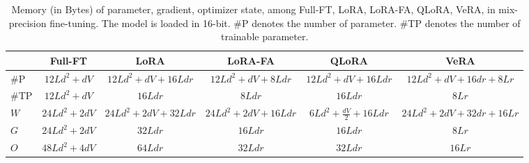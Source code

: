 \begin{table}[htbp]
\centering
\scriptsize
\caption{Memory (in Bytes) of parameter, gradient, optimizer state, among Full-FT, LoRA, LoRA-FA, QLoRA, VeRA, in mix-precision fine-tuning. The model is loaded in 16-bit. \#P denotes the number of parameter. \#TP denotes the number of trainable parameter.}
\label{tab:WGO}
\addtolength{\tabcolsep}{-5.5pt}
\begin{tabular}{lccccc} 
\hline
 & Full-FT & LoRA & LoRA-FA & QLoRA & VeRA \\ 
\hline
\#P & $12Ld^2+dV$ & $12Ld^2+dV+16Ldr$ & $12Ld^2+dV+8Ldr$ & $12Ld^2+dV+16Ldr$ & $12Ld^2+dV+16dr+8Lr$ \\
\#TP & $12Ld^2+dV$ & $16Ldr$ & $8Ldr$ & $16Ldr$ & $8Lr$ \\
$W$ & $24Ld^2+2dV$ & $24Ld^2+2dV+32Ldr$ & $24Ld^2+2dV+16Ldr$ & $6Ld^2+\frac{dV}{2}+16Ldr$ & $24Ld^2+2dV+32dr+16Lr$ \\
$G$ & $24Ld^2+2dV$ & $32Ldr$ & $16Ldr$ & $16Ldr$ & $8Lr$ \\
$O$ & $48Ld^2+4dV$ & $64Ldr$ & $32Ldr$ & $32Ldr$ & $16Lr$ \\
\hline
\end{tabular}
\end{table}